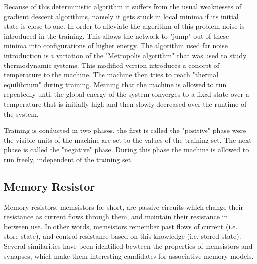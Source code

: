 \documentclass[12pt, a4paper]{article}
\begin{document}
Because of this deterministic algorithm it suffers from the usual weaknesses of gradient descent algorithms, namely it gets stuck in local minima if its initial state is close to one. In order to alleviate the algorithm of this problem noise is introduced in the training. This allows the network to "jump" out of these minima into configurations of higher energy. The algorithm used for noise introduction is a variation of the "Metropolis algorithm" \cite{metropolis1953equation} that was used to study thermodynamic systems. This modified version introduces a concept of temperature to the machine. The machine then tries to reach "thermal equilibrium" during training. Meaning that the machine is allowed to run repeatedly until the global energy of the system converges to a fixed state over a temperature that is initially high and then slowly decreased over the runtime of the system.


Training is conducted in two phases, the first is called the "positive" phase were the visible units of the machine are set to the values of the training set. The next phase is called the "negative" phase. During this phase the machine is allowed to run freely, independent of the training set.







\subsection{Memory Resistor}


Memory resistors, memsistors for short, are passive circuits which change their resistance as current flows through them, and maintain their resistance in between use. In other words, memsistors remember past flows of current (i.e. store state), and control resistance based on this knowledge (i.e. stored state). Several similarities have been identified bewteen the properties of memsistors and synapses, which make them interesting candidates for associative memory models.
\end{document}
